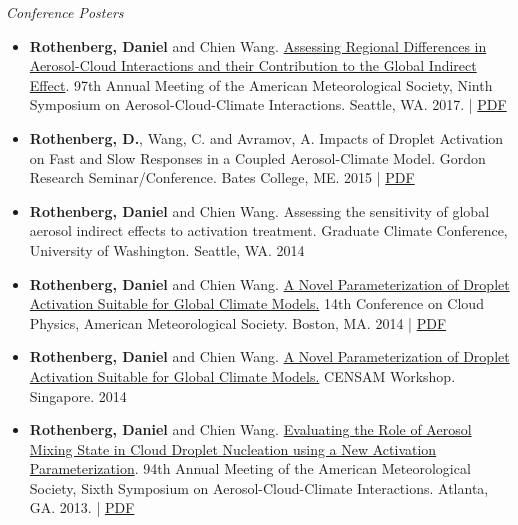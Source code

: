 \documentclass[11pt,letterpaper]{article}
\begin{document}
\bigskip
\emph{Conference Posters}
\medskip
\begin{itemize}[itemindent=-10pt]

 \item \textbf{Rothenberg, Daniel} and Chien Wang. \href{https://app.core-apps.com/ams2017/abstract/15b6ce6f2a9ba4be8e489d83ea69e909}{Assessing Regional Differences in Aerosol-Cloud Interactions and their Contribution to the Global Indirect Effect}. 97th Annual Meeting of the American Meteorological Society, Ninth Symposium on Aerosol-Cloud-Climate Interactions. Seattle, WA. 2017. | \href{https://figshare.com/s/f7bef67cb5d120e17a96}{PDF}

 \item \textbf{Rothenberg, D.}, Wang, C. and Avramov, A. Impacts of Droplet Activation on Fast and Slow Responses in a Coupled Aerosol-Climate Model. Gordon Research Seminar/Conference. Bates College, ME. 2015 | \href{http://figshare.com/articles/poster_pdf/1534717}{PDF}

 \item \textbf{Rothenberg, Daniel} and Chien Wang. Assessing the sensitivity of global aerosol indirect effects to activation treatment. Graduate Climate Conference, University of Washington. Seattle, WA. 2014

 \item \textbf{Rothenberg, Daniel} and Chien Wang. \href{https://ams.confex.com/ams/14CLOUD14ATRAD/webprogram/Paper250349.html}{A Novel Parameterization of Droplet Activation Suitable for Global Climate Models.} 14th Conference on Cloud Physics, American Meteorological Society. Boston, MA. 2014 |  \href{http://figshare.com/articles/A_Novel_Parameterization_of_Droplet_Activation_Suitable_for_Global_Climate_Models/1085984}{PDF}

 \item \textbf{Rothenberg, Daniel} and Chien Wang. \href{http://figshare.com/articles/A_Novel_Parameterization_of_Droplet_Activation_Suitable_for_Global_Climate_Models/1085984}{A Novel Parameterization of Droplet Activation Suitable for Global Climate Models.} CENSAM Workshop. Singapore. 2014

 \item \textbf{Rothenberg, Daniel} and Chien Wang. \href{https://ams.confex.com/ams/94Annual/webprogram/Paper240205.html}{Evaluating the Role of Aerosol Mixing State in Cloud Droplet Nucleation using a New Activation Parameterization}. 94th Annual Meeting of the American Meteorological Society, Sixth Symposium on Aerosol-Cloud-Climate Interactions. Atlanta, GA. 2013. | \href{https://figshare.com/articles/AMS_2014_Evaluating_the_Role_of_Aerosol_Mixing_State_in_Cloud_Droplet_Nucleation_towards_Developing_a_New_Activation_Parameterization/918655}{PDF}


\end{itemize}
\end{document}
